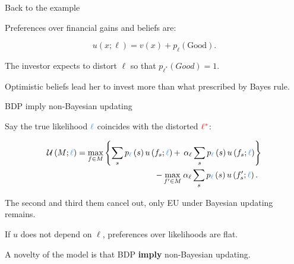 \documentclass[usenames,dvipsnames,aspectratio=169,11pt, handout]{beamer}
\begin{document}
\begin{frame}{Back to the example}
\begin{table}[H]
\begin{minipage}{0.45\textwidth}
\begin{tikzpicture}[x=0.75pt,y=0.75pt,yscale=-1,xscale=1]
			\end{tikzpicture}
		\end{minipage}
	\end{table}

	\vfill

	Preferences over financial gains and beliefs are:

	\vfill

	\[
		u \left( x; \ell \right) = v \left( x \right) + p_{\ell} \left( \text{Good} \right).
	\] \pause

	\vfill

	The investor expects to distort \( \ell \) so that \( p_{\ell^{*}} \left( Good \right) = 1 \).

	\vfill

	Optimistic beliefs lead her to invest more than what prescribed by Bayes rule.
\end{frame}

\begin{frame}{BDP imply non-Bayesian updating}

	Say the true likelihood \( \textcolor{RoyalBlue}{\ell} \) coincides with the distorted \( \textcolor{red}{\ell^{*}} \):

	\vfill

	\[
		\begin{aligned}
			\mathcal{U} \left(M ; \textcolor{RoyalBlue}{\ell} \right) = \max _{f \in M}\left\{\sum_{s} p_{\textcolor{RoyalBlue}{\ell}} \left( s \right) u \left( f_{s} ; \textcolor{RoyalBlue}{\ell} \right) + \right. & \left. \alpha_{\ell} \sum_{s} p_{\textcolor{RoyalBlue}{\ell}} \left( s \right) u \left( f_{s} ; \textcolor{RoyalBlue}{\ell} \right) \right\} \\
			-\max _{f^{\prime} \in M}                                                                                                                                                                                  & \: \alpha _{\ell} \sum_{s} p_{\textcolor{RoyalBlue}{\ell}} \left( s \right) u\left(f^{\prime}_{s} ; \textcolor{RoyalBlue}{\ell} \right) .
		\end{aligned}
	\]

	\vfill

	The second and third them cancel out, only EU under Bayesian updating remains. \pause

	\vfill

	If \( u \) does not depend on \( \ell \), preferences over likelihoods are flat.

	\vfill
	A novelty of the model is that BDP \textbf{imply} non-Bayesian updating.

\end{frame}
\end{document}
